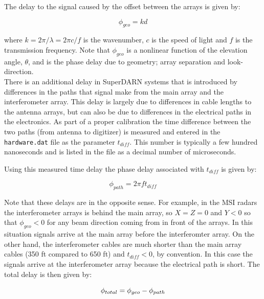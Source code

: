 \documentclass{article}
\begin{document}
\noindent
The delay to the signal caused by the offset between the arrays is given by:

\begin{equation}
\phi_{geo} = k d %
\end{equation}

\noindent
where $k = 2 \pi / \lambda = 2 \pi c / f$ is the wavenumber, $c$ is the speed
of light and $f$ is the transmission frequency. Note that $\phi_{geo}$ is a
nonlinear function of the elevation angle, $\theta$, and is the phase delay
due to geometry; array separation and look-direction. \\

\noindent
There is an additional delay in SuperDARN systems that is introduced by
differences in the paths that signal make from the main array and the
interferometer array. This delay is largely due to differences in cable
lengths to the antenna arrays, but can also be due to differences in the
electrical paths in the electronics. As part of a proper calibration the
time difference between the two paths (from antenna to digitizer) is measured
and entered in the {\tt hardware.dat} file as the parameter $t_{diff}$. This
number is typically a few hundred nanoseconds and is listed in the file as a
decimal number of microseconds.

\noindent
Using this measured time delay the phase delay associated with $t_{diff}$ is
given by:

\begin{equation}
\phi_{path} = 2 \pi f t_{diff}
\end{equation}

\noindent
Note that these delays are in the opposite sense. For example, in the MSI
radars the interferometer arrays is behind the main array, so $X = Z = 0$
and $Y < 0$ so that $\phi_{geo} < 0$ for any beam direction coming from in
front of the arrays. In this situation signals arrive at the main array before
the interferomter array. On the other hand, the interferometer cables are
much shorter than the main array cables (350 ft compared to 650 ft) and
$t_{diff} < 0$, by convention. In this case the signals arrive at the
interferometer array because the electrical path is short. The total delay
is then given by:

\begin{equation}
\phi_{total} = \phi_{geo} - \phi_{path} \label{eq:total} \\[5mm]
\end{equation}
\end{document}

